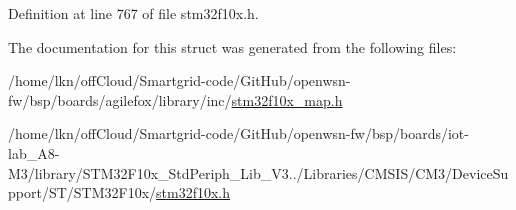 Definition at line 767 of file stm32f10x.\+h.



The documentation for this struct was generated from the following files\+:\begin{DoxyCompactItemize}
\item 
/home/lkn/off\+Cloud/\+Smartgrid-\/code/\+Git\+Hub/openwsn-\/fw/bsp/boards/agilefox/library/inc/\hyperlink{agilefox_2library_2inc_2stm32f10x__map_8h}{stm32f10x\+\_\+map.\+h}\item 
/home/lkn/off\+Cloud/\+Smartgrid-\/code/\+Git\+Hub/openwsn-\/fw/bsp/boards/iot-\/lab\+\_\+\+A8-\/\+M3/library/\+S\+T\+M32\+F10x\+\_\+\+Std\+Periph\+\_\+\+Lib\+\_\+\+V3../\+Libraries/\+C\+M\+S\+I\+S/\+C\+M3/\+Device\+Support/\+S\+T/\+S\+T\+M32\+F10x/\hyperlink{iot-lab___a8-_m3_2library_2_s_t_m32_f10x___std_periph___lib___v3_85_80_2_libraries_2_c_m_s_i_s_26497265545392eb5694b064ae15018db}{stm32f10x.\+h}\end{DoxyCompactItemize}

